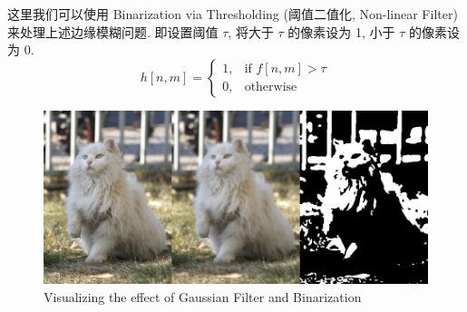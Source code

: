这里我们可以使用 Binarization via Thresholding (阈值二值化, Non-linear Filter) 来处理上述边缘模糊问题. 即设置阈值 $\tau$, 将大于 $\tau$ 的像素设为 1, 小于 $\tau$ 的像素设为 0.
\[
    h[n, m] = \begin{cases}
        1, & \text{if } f[n, m] > \tau \\
        0, & \text{otherwise}
    \end{cases}
\]
\begin{figure}[htbp]
    \centering
    \includegraphics[scale=0.35]{figures/cat_gaussian.png}
    \caption{Visualizing the effect of Gaussian Filter and Binarization}
\end{figure}

